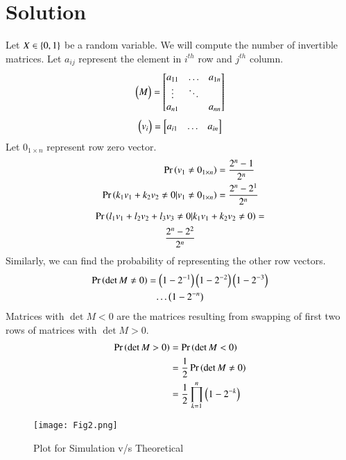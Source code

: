 \documentclass[journal,12pt,twocolumn]{IEEEtran}
\begin{document}
\section*{Solution}
Let $X \in \left\{0,1\right\}$ be a random variable. We will compute the number of invertible matrices. Let $a_{ij}$ represent the element in $i^{th}$ row and $j^{th}$ column.
\begin{align}
    \begin{pmatrix}M\end{pmatrix}=
    \begin{bmatrix}
    a_{11} & \dots & a_{1n} \\
    \vdots & \ddots & \\
    a_{n1} &        & a_{nn}
    \end{bmatrix}
\end{align}
\begin{align}
    \begin{pmatrix}v_i\end{pmatrix} =
    \begin{bmatrix}
    a_{i1} & \dots &a_{in}
    \end{bmatrix}
\end{align}
Let $0_{1 \times n}$ represent row zero vector.
\begin{align}
    \Pr\left(v_1 \neq 0_{1 \times n}\right) &= \frac{2^n - 1}{2^n}\\
    \Pr\left(k_1v_1 + k_2v_2 \neq 0 | v_1 \neq 0_{1 \times n}\right) &= \frac{2^n - 2^1}{2^n}
\end{align}
\begin{multline}
    \Pr\left(l_1v_1 + l_2v_2 + l_3v_3 \neq 0 | k_1v_1 + k_2v_2 \neq 0\right) =\\ \frac{2^n - 2^2}{2^n}
\end{multline}
Similarly, we can find the probability of representing the other row vectors.
\begin{multline}
    \Pr\left(\det{M} \neq 0\right) = \left(1 - 2^{-1}\right)\left(1 - 2^{-2}\right)\left(1 - 2^{-3}\right)\\ \dots \left(1 - 2^{-n}\right)
\end{multline}
Matrices with $\det{M} < 0$ are the matrices resulting from swapping of first two rows of matrices with $\det{M} > 0$.
\begin{align}
    \Pr\left(\det{M} > 0\right) &= \Pr\left(\det{M} < 0\right)\\
    &= \frac{1}{2}\Pr\left(\det{M} \neq 0\right)\\
    &= \frac{1}{2}\prod_{k = 1}^{n}\left(1 - 2^{-k}\right)
\end{align}
\begin{figure}[h]
    \centering
    \texttt{[image: Fig2.png]}
    \caption{Plot for Simulation v/s Theoretical}
    \label{fig:plot}
\end{figure}
\end{document}
